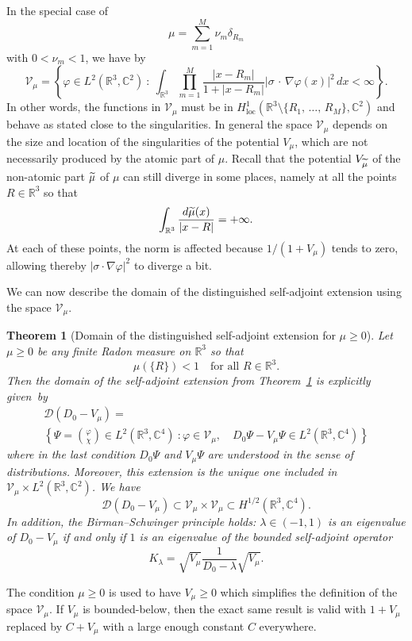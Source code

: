\documentclass[10pt]{amsart}
\newtheorem{theo}[cdrthm]{Theorem}
\theoremstyle{definition}
\newcommand{\R}{\mathbb{R}}
\newcommand{\C}{\mathbb{C}}
\newcommand{\cV}{\mathcal{V}}
\newcommand{\cD}{\mathcal{D}}
\DeclareMathOperator{\loc}{loc}
\newcommand\1{{\ensuremath {\mathds 1} }}
\renewcommand\phi{\varphi}
\newcommand{\ii}{\infty}
\renewcommand{\geq}{\geqslant}
\renewcommand{\tilde}{\widetilde}
\let\oldtilde\tilde
\renewcommand*{\tilde}[1]{\mathchoice{\widetilde{#1}}{\widetilde{#1}}{\oldtilde{#1}}{\oldtilde{#1}}}
\begin{document}
\goodbreak
In the special case of
\[
\mu=\sum_{m=1}^M\nu_m\delta_{R_m}
\]
with $0< \nu_m<1$, we have by~\cite{EstLewSer-19}
\[
\cV_\mu=\left\{\phi \in L^2\left(\R^3,\C^2\right)\ :\ \int_{\R^3}\prod_{m=1}^M\frac{|x-R_m|}{1+|x-R_m|}\left|\sigma\,\cdot\,\nabla \phi(x)\right|^2\,dx<\ii\right\}.
\]
In other words, the functions in $\cV_\mu$ must be in $H^1_{\loc}(\R^3\setminus\{R_1,\,\dots,\,R_M\},\C^2)$ and behave as stated close to the singularities. In general the space $\cV_\mu$ depends on the size and location of the singularities of the potential $V_\mu$, which are not necessarily produced by the atomic part of $\mu$. Recall that the potential $V_{\tilde\mu}$ of the non-atomic part $\tilde\mu$ of $\mu$ can still diverge in some places, namely at all the points $R\in\R^3$ so that
\[
\int_{\R^3}\frac{d\tilde\mu(x)}{|x-R|}=+\ii.
\]
At each of these points, the norm is affected because $1/(1+V_\mu)$ tends to zero, allowing thereby $|\sigma\cdot\nabla\phi|^2$ to diverge a bit.

We can now describe the domain of the distinguished self-adjoint extension using the space $\cV_\mu$.

\begin{theo}[Domain of the distinguished self-adjoint extension for $\mu\geq0$]\label{thm:self-adjoint}
Let $\mu\geq0$ be any finite Radon measure on $\R^3$ so that
\[
\mu(\{R\})<1\quad \text{for all }R\in\R^3.
\]
Then the domain of the self-adjoint extension from Theorem~\ref{thm:self-adjoint} is explicitly given~by
\begin{multline}\label{eq:inclusion_domain_cV}
\cD(D_0-V_\mu)=\\
\left\{\Psi=
\binom{\phi}{\chi}
\in L^2\left(\R^3,\C^4\right)\ : \phi\in\cV_\mu,\quad D_0\Psi-V_\mu\Psi\in L^2\left(\R^3,\C^4\right)\right\}
\end{multline}
where in the last condition $D_0\Psi$ and $V_\mu\Psi$ are understood in the sense of distributions. Moreover, this extension is the unique one included in $\cV_\mu\times L^2(\R^3,\C^2)$. We have
\[
\cD\left(D_0-V_\mu\right) \subset \cV_\mu\times \cV_\mu\subset H^{1/2}\left(\R^3,\C^4\right).
\]
In addition, the Birman--Schwinger principle holds: $\lambda\in(-1,1)$ is an eigenvalue of $D_0-V_\mu$ if and only if $1$ is an eigenvalue of the bounded self-adjoint operator
\[
K_\lambda=\sqrt{V_\mu}\frac{1}{D_0-\lambda}\sqrt{V_\mu}.
\]
\end{theo}

The condition $\mu\geq0$ is used to have $V_\mu\geq0$ which simplifies the definition of the space $\cV_\mu$. If $V_\mu$ is bounded-below, then the exact same result is valid with $1+V_\mu$ replaced by $C+V_\mu$ with a large enough constant $C$ everywhere.
\end{document}

